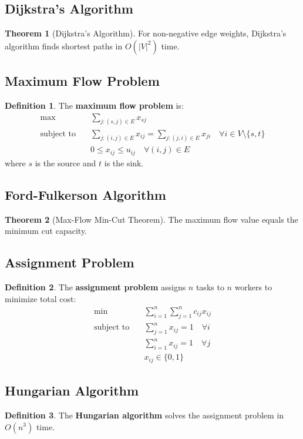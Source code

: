 \documentclass[11pt]{article}
\theoremstyle{definition}
\newtheorem{definition}{Definition}[section]
\newtheorem{theorem}{Theorem}[section]
\begin{document}
\subsection{Dijkstra's Algorithm}
\begin{theorem}[Dijkstra's Algorithm]
For non-negative edge weights, Dijkstra's algorithm finds shortest paths in $O(|V|^2)$ time.
\end{theorem}

\subsection{Maximum Flow Problem}
\begin{definition}
The \textbf{maximum flow problem} is:
\begin{align}
\max \quad & \sum_{j:(s,j) \in E} x_{sj} \\
\text{subject to} \quad & \sum_{j:(i,j) \in E} x_{ij} = \sum_{j:(j,i) \in E} x_{ji} \quad \forall i \in V \setminus \{s,t\} \\
& 0 \leq x_{ij} \leq u_{ij} \quad \forall (i,j) \in E
\end{align}
where $s$ is the source and $t$ is the sink.
\end{definition}

\subsection{Ford-Fulkerson Algorithm}
\begin{theorem}[Max-Flow Min-Cut Theorem]
The maximum flow value equals the minimum cut capacity.
\end{theorem}

\subsection{Assignment Problem}
\begin{definition}
The \textbf{assignment problem} assigns $n$ tasks to $n$ workers to minimize total cost:
\begin{align}
\min \quad & \sum_{i=1}^n \sum_{j=1}^n c_{ij} x_{ij} \\
\text{subject to} \quad & \sum_{j=1}^n x_{ij} = 1 \quad \forall i \\
& \sum_{i=1}^n x_{ij} = 1 \quad \forall j \\
& x_{ij} \in \{0,1\}
\end{align}
\end{definition}

\subsection{Hungarian Algorithm}
\begin{definition}
The \textbf{Hungarian algorithm} solves the assignment problem in $O(n^3)$ time.
\end{definition}
\end{document}
